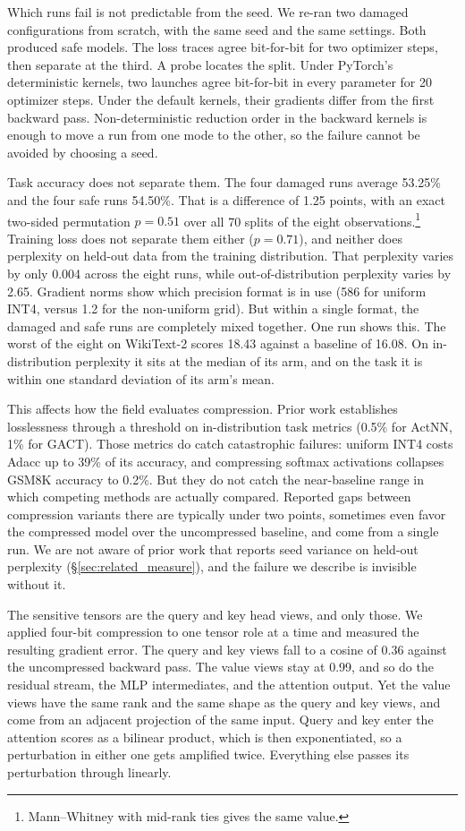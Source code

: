\documentclass[11pt,letterpaper]{article}
\begin{document}
Which runs fail is not predictable from the seed. We re-ran two damaged configurations from scratch, with the same seed and the same settings. Both produced safe models. The loss traces agree bit-for-bit for two optimizer steps, then separate at the third. A probe locates the split. Under PyTorch's deterministic kernels, two launches agree bit-for-bit in every parameter for 20 optimizer steps. Under the default kernels, their gradients differ from the first backward pass. Non-deterministic reduction order in the backward kernels is enough to move a run from one mode to the other, so the failure cannot be avoided by choosing a seed.

Task accuracy does not separate them. The four damaged runs average 53.25\% and the four safe runs 54.50\%. That is a difference of 1.25 points, with an exact two-sided permutation $p = 0.51$ over all 70 splits of the eight observations.\footnote{Mann--Whitney with mid-rank ties gives the same value.} Training loss does not separate them either ($p = 0.71$), and neither does perplexity on held-out data from the training distribution. That perplexity varies by only 0.004 across the eight runs, while out-of-distribution perplexity varies by 2.65. Gradient norms show which precision format is in use (586 for uniform INT4, versus 1.2 for the non-uniform grid). But within a single format, the damaged and safe runs are completely mixed together. One run shows this. The worst of the eight on WikiText-2 scores 18.43 against a baseline of 16.08. On in-distribution perplexity it sits at the median of its arm, and on the task it is within one standard deviation of its arm's mean.

This affects how the field evaluates compression. Prior work establishes losslessness through a threshold on in-distribution task metrics (0.5\% for ActNN, 1\% for GACT). Those metrics do catch catastrophic failures: uniform INT4 costs Adacc \citep{adacc2025} up to 39\% of its accuracy, and compressing softmax activations collapses GSM8K accuracy to 0.2\%. But they do not catch the near-baseline range in which competing methods are actually compared. Reported gaps between compression variants there are typically under two points, sometimes even favor the compressed model over the uncompressed baseline, and come from a single run. We are not aware of prior work that reports seed variance on held-out perplexity (\S\ref{sec:related_measure}), and the failure we describe is invisible without it.

The sensitive tensors are the query and key head views, and only those. We applied four-bit compression to one tensor role at a time and measured the resulting gradient error. The query and key views fall to a cosine of 0.36 against the uncompressed backward pass. The value views stay at 0.99, and so do the residual stream, the MLP intermediates, and the attention output. Yet the value views have the same rank and the same shape as the query and key views, and come from an adjacent projection of the same input. Query and key enter the attention scores as a bilinear product, which is then exponentiated, so a perturbation in either one gets amplified twice. Everything else passes its perturbation through linearly.
\end{document}
